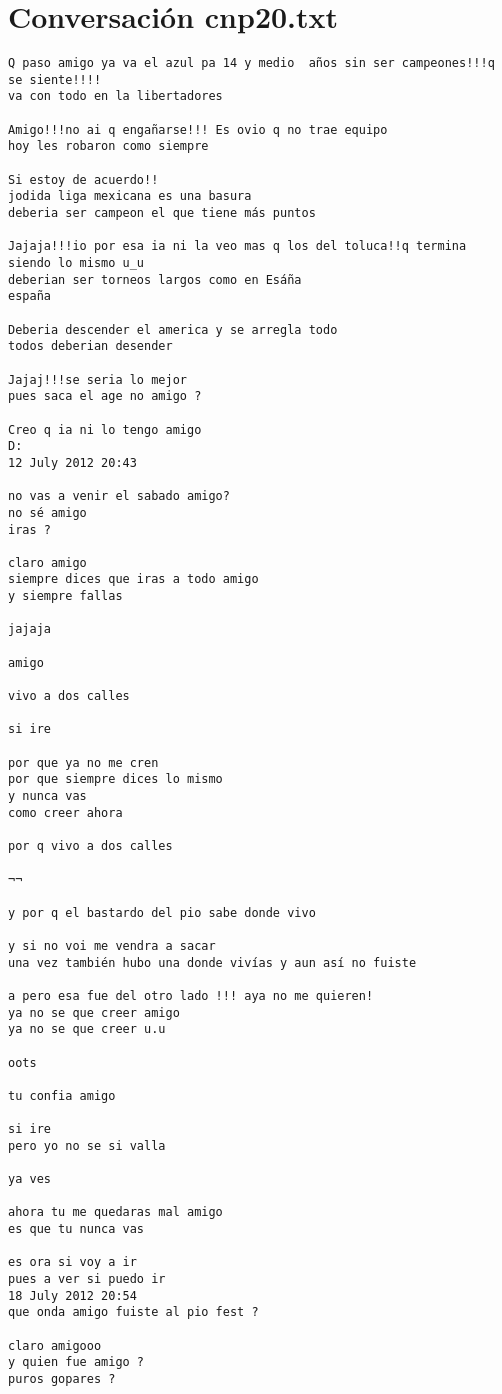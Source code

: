 \section{Conversaci\'on cnp20.txt}
\begin{verbatim}
Q paso amigo ya va el azul pa 14 y medio  años sin ser campeones!!!q se siente!!!!
va con todo en la libertadores

Amigo!!!no ai q engañarse!!! Es ovio q no trae equipo
hoy les robaron como siempre

Si estoy de acuerdo!!
jodida liga mexicana es una basura
deberia ser campeon el que tiene más puntos

Jajaja!!!io por esa ia ni la veo mas q los del toluca!!q termina siendo lo mismo u_u
deberian ser torneos largos como en Esáña
españa

Deberia descender el america y se arregla todo
todos deberian desender

Jajaj!!!se seria lo mejor
pues saca el age no amigo ?

Creo q ia ni lo tengo amigo
D:
12 July 2012 20:43

no vas a venir el sabado amigo?
no sé amigo
iras ?

claro amigo
siempre dices que iras a todo amigo
y siempre fallas

jajaja

amigo

vivo a dos calles

si ire

por que ya no me cren
por que siempre dices lo mismo
y nunca vas
como creer ahora

por q vivo a dos calles

¬¬

y por q el bastardo del pio sabe donde vivo

y si no voi me vendra a sacar
una vez también hubo una donde vivías y aun así no fuiste

a pero esa fue del otro lado !!! aya no me quieren!
ya no se que creer amigo
ya no se que creer u.u

oots

tu confia amigo

si ire
pero yo no se si valla

ya ves

ahora tu me quedaras mal amigo
es que tu nunca vas

es ora si voy a ir
pues a ver si puedo ir
18 July 2012 20:54
que onda amigo fuiste al pio fest ?

claro amigooo
y quien fue amigo ?
puros gopares ?


\end{verbatim}
